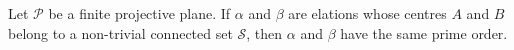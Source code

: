 Let $\mathcal{P}$ be a finite projective plane. If $\alpha$ and $\beta$ are elations whose centres $A$ and $B$ belong to a non-trivial connected set $\mathcal{S}$, then $\alpha$ and $\beta$ have the same prime order.
